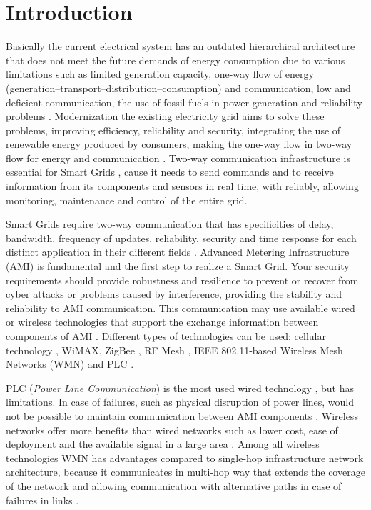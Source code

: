 \documentclass[conference]{IEEEtran}
\begin{document}
\section{Introduction}
Basically the current electrical system has an outdated hierarchical architecture that does not meet the future demands of energy consumption due to various limitations such as limited generation capacity, one-way flow of energy (generation–transport–distribution–consumption) and communication,  low and deficient communication, the use of fossil fuels in power generation and reliability problems \cite{Farhangi2010}. 
Modernization the existing electricity grid aims to solve these problems, improving efficiency, reliability and security, integrating the use of renewable energy produced by consumers, making the one-way flow in two-way flow for energy and communication \cite {Farhangi2010,Moslehi2010}. Two-way communication infrastructure is essential for Smart Grids \cite{Gungor2011}, cause it needs to send commands and to receive information from its components and sensors  in real time, with reliably, allowing monitoring, maintenance and control of the entire grid. 

Smart Grids require two-way communication that has specificities of delay, bandwidth, frequency of updates, reliability, security and time response for each distinct application in their different fields \cite{Gungor2011}. Advanced Metering Infrastructure (AMI) is fundamental and the first step to realize a Smart Grid\cite{4781067,5484223}. Your security requirements should provide robustness and resilience to prevent or recover from cyber attacks or problems caused by interference, providing the stability and reliability to AMI communication. This communication may use available wired or wireless technologies that support the exchange information between components of AMI \cite{Saputro2012,4547164}. Different types of technologies can be used: cellular technology \cite{5589988}, WiMAX, ZigBee \cite{5589988}, RF Mesh \cite{5622071}, IEEE 802.11-based Wireless Mesh Networks (WMN) and PLC \cite{5479945}. 

PLC (\emph{Power Line Communication}) is the most used wired technology \cite{Saputro2012}, but has limitations. In case of failures, such as physical disruption of power lines, would not be possible to maintain communication between AMI components \cite{Gungor2006}. Wireless networks offer more benefits than wired networks such as lower cost, ease of deployment and the available signal in a large area \cite{5589988}. Among all wireless technologies WMN has advantages compared to single-hop infrastructure network architecture, because it communicates in multi-hop way that extends the coverage of the network and allowing communication with alternative paths in case of failures in links \cite{5622071,Fang2012}. 
\end{document}
